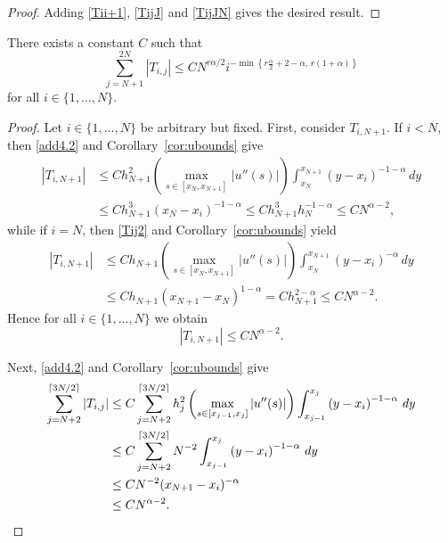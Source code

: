 \documentclass[smallextended]{svjour3}       %
\begin{document}
\begin{proof}
	Adding \eqref{Tii+1}, \eqref{TijJ} and \eqref{TijJN} gives the desired result.
\end{proof}

\begin{lemma}\label{lem4.3imp}
	There exists a constant $C$ such that
	\[
	\sum_{j=N+1}^{2N} |T_{i,j}| \le C N^{r\alpha/2}  i^{-\min \left\{r\frac{\alpha}{2}+2-\alpha,\, r(1+\alpha)\right\} }
	\]
	for all $i\in\{1, \dots, N\}$.
\end{lemma}
\begin{proof}
	Let $i\in\{1, \dots, N\}$ be arbitrary but fixed.
	First, consider $T_{i,N+1}$. If $i<N$, then \eqref{add4.2} and Corollary~\ref{cor:ubounds} give
	\begin{align*}
		\left|T_{i,N+1}\right| &\le Ch_{N+1}^2 \left(\max_{s\in[x_N, x_{N+1}]} \left| u''(s)\right| \right)
		\int_{x_N}^{x_{N+1}}  \left(y - x_{i}\right)^{-1-\alpha} \,dy \\
		&\le Ch_{N+1}^3 (x_N-x_i)^{-1-\alpha} \le Ch_{N+1}^3 h_N^{-1-\alpha} \le CN^{\alpha-2},
	\end{align*}
	while if $i=N$, then \eqref{Tij2} and Corollary~\ref{cor:ubounds} yield
	\begin{align*}
		\left|T_{i,N+1}\right| &\le Ch_{N+1} \left(\max_{s\in[x_N, x_{N+1}]} \left| u''(s)\right| \right)
		\int_{x_N}^{x_{N+1}}  \left(y - x_{i}\right)^{-\alpha}   \,dy \\
		&\le Ch_{N+1} (x_{N+1}-x_N)^{1-\alpha} = Ch_{N+1}^{2-\alpha} \le CN^{\alpha-2}.
	\end{align*}
	Hence for all $i\in\{1, \dots, N\}$ we obtain
	\begin{equation}\label{TiN+1imp}
		\left|T_{i,N+1}\right| \le CN^{\alpha-2}.
	\end{equation}
	
	Next,  \eqref{add4.2} and Corollary~\ref{cor:ubounds} give
	\begin{align}
		\sum_{j=N+2}^{\lceil 3N/2\rceil}  |T_{i,j}| &\le C \sum_{j=N+2}^{\lceil 3N/2\rceil} h_j^2
		\left(\max_{s\in[x_{j-1}, x_j]} \left| u''(s)\right| \right)
		\int_{x_{j-1}}^{x_j}  \left(y - x_{i}\right)^{-1-\alpha} \,dy \notag\\
		&\le C \sum_{j=N+2}^{\lceil 3N/2\rceil} N^{-2}
		\int_{x_{j-1}}^{x_j}  \left(y - x_{i}\right)^{-1-\alpha} \,dy \notag\\
		&\le CN^{-2} (x_{N+1}-x_i)^{-\alpha}  \notag\\
		 &\le CN^{\alpha-2}. \label{TiN+2imp}
	\end{align}
	

\end{proof}
\end{document}
